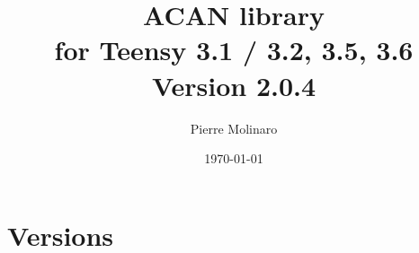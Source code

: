 \documentclass[10pt, a4paper, obeyspaces, openany]{extarticle}
\begin{document}
 


\title{\bf \Huge{ACAN library\\for Teensy 3.1 / 3.2, 3.5, 3.6\\Version 2.0.4}}
\author{Pierre Molinaro}
\date {\today}

\maketitle


\tableofcontents


\section{Versions}
\end{document}
